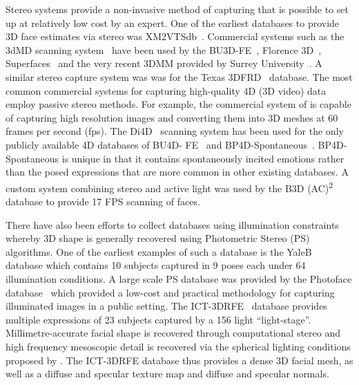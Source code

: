 Stereo systems provide a non-invasive method of capturing that is possible to
set up at relatively low cost by an expert. One of the earliest databases to
provide 3D face estimates via stereo was XM2VTSdb~\cite{messer1999xm2vtsdb}.
Commercial systems such as the 3dMD scanning system~\cite{3dmd} have been used
by the BU3D-FE~\cite{Yin:2006cc}, Florence 3D~\cite{bagdanov2011florence},
Superfaces~\cite{berretti2012superfaces} and the very recent 3DMM provided by
Surrey University~\cite{Huber:F5Dca9zy}. A similar stereo capture system was was
for the Texas 3DFRD~\cite{gupta2010anthropometric} database. The most common
commercial systems for capturing high-quality 4D (3D video) data employ passive
stereo methods. For example, the commercial
system of \citet{di4d} is capable of capturing high resolution images and
converting them into 3D meshes at 60 frames per second (fps).
The Di4D~\cite{di4d} scanning system
has been used for the only publicly available 4D databases of BU4D-
FE~\cite{yin2008high} and BP4D-Spontaneous~\cite{Zhang:2014id}. BP4D-Spontaneous
is unique in that it contains spontaneously incited emotions rather than the
posed expressions that are more common in other existing databases. A custom
system combining stereo and active light was used by the B3D
(AC)\textsuperscript{2}~\cite{weise2007fast,fanelli2013random} database to
provide 17 FPS scanning of faces.

There have also been efforts to collect databases using illumination constraints
whereby 3D shape is generally recovered using
Photometric Stereo (PS)~\cite{woodham1980photometric}
algorithms. One of the earliest examples of such a database is the
YaleB~\cite{georghiades2001fromfew} database which contains 10 subjects captured in
9 poses each under 64 illumination conditions. A large scale PS database was
provided by the Photoface database~\cite{RefWorks:293} which provided a low-cost
and practical methodology for capturing illuminated images in a public setting.
The ICT-3DRFE~\cite{stratou2012exploring} database provides multiple expressions
of 23 subjects captured by a 156 light ``light-stage''. Millimetre-accurate
facial shape is recovered through computational stereo and high frequency
mesoscopic detail is recovered via the spherical lighting conditions proposed
by \citet{ma2007rapid}. The ICT-3DRFE database thus provides a dense
3D facial mesh, as well as a diffuse and specular texture map and diffuse and
specular normals.
